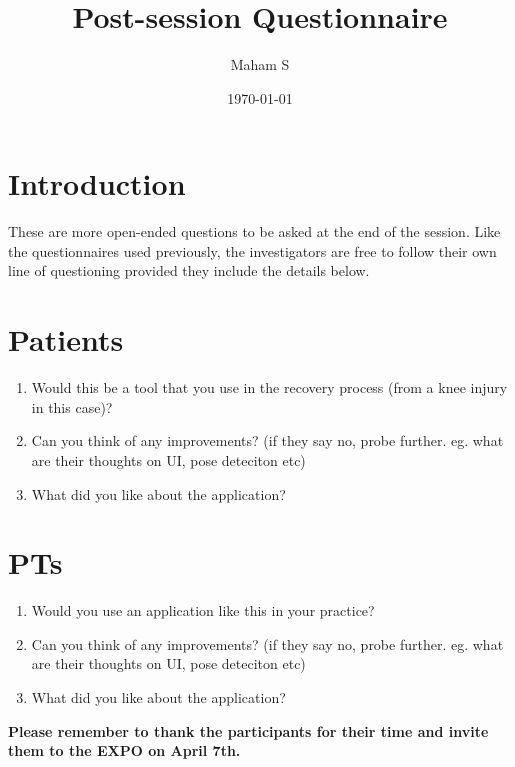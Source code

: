 \documentclass{article}
\title{Post-session Questionnaire}
\author{Maham S}
\date{\today}
\begin{document}
\maketitle
\newpage
\tableofcontents
\newpage

\section{Introduction}
These are more open-ended questions to be asked at the end of the session. Like the questionnaires used previously, the investigators
are free to follow their own line of questioning provided they include the details below. 

\section{Patients}
\begin{enumerate}
    \item Would this be a tool that you use in the recovery process (from a knee injury in this case)?
    \item Can you think of any improvements? (if they say no, probe further. eg. what are their thoughts on UI, pose deteciton etc)
    \item What did you like about the application?
\end{enumerate}

\section{PTs}
\begin{enumerate}
    \item Would you use an application like this in your practice? %
    \item Can you think of any improvements? (if they say no, probe further. eg. what are their thoughts on UI, pose deteciton etc)
    \item What did you like about the application? 
\end{enumerate}

\noindent \textbf{Please remember to thank the participants for their time and invite them to the EXPO on April 7th.}
\end{document}
